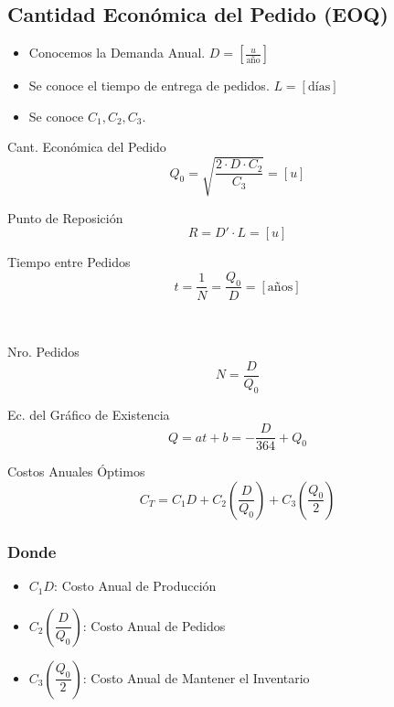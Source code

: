 \documentclass[10pt,letterpaper]{article}
\begin{document}
\subsection{Cantidad Económica del Pedido (EOQ)}
\begin{itemize}
\item Conocemos la Demanda Anual. $D = \left[ \frac{u}{\text{año}}\right] $
\item Se conoce el tiempo de entrega de pedidos. $L=[\text{días}]$
\item Se conoce $C_1,C_2,C_3$.
\end{itemize}
\begin{enumerate}
\noindent
\begin{minipage}[t]{.33\textwidth}
\raggedright
\item Cant. Económica del Pedido \noindent
$$Q_0 = \sqrt{ \dfrac{2\cdot D \cdot C_2}{C_3}}=[u]$$
\end{minipage}%
\begin{minipage}[t]{.33\textwidth}
\raggedright
\item Punto de Reposición \noindent
$$R=D'\cdot L = [u]$$
\end{minipage}%
\begin{minipage}[t]{.33\textwidth}
\raggedright
\item Tiempo entre Pedidos \noindent
$$t=\dfrac{1}{N}=\dfrac{Q_0}{D}=[\text{años}]$$
\end{minipage}
\\${ }$\\
\noindent
\begin{minipage}[t]{.5\textwidth}
\raggedright
\item Nro. Pedidos
$$N = \dfrac{D}{Q_0}$$
\end{minipage}%
\begin{minipage}[t]{.5\textwidth}
\raggedright
\item Ec. del Gráfico de Existencia
$$Q=at+b = -\dfrac{D}{364}+Q_0$$
\end{minipage}%
\item Costos Anuales Óptimos
$$C_T = C_1 D + C_2 \left( \dfrac{D}{Q_0} \right) + C_3 \left( \dfrac{Q_0}{2} \right)$$
\end{enumerate}
\subsubsection*{Donde}
\begin{itemize}
\item $C_1 D$: Costo Anual de Producción
\item $C_2 \left( \dfrac{D}{Q_0} \right)$: Costo Anual de Pedidos
\item $C_3 \left( \dfrac{Q_0}{2} \right)$: Costo Anual de Mantener el Inventario
\end{itemize}
\vspace{0.1cm}
\end{document}
